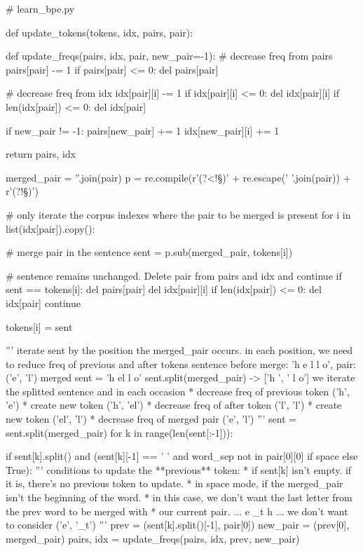 \begin{python}
# learn_bpe.py

def update_tokens(tokens, idx, pairs, pair):

  def update_freqs(pairs, idx, pair, new_pair=-1):
    # decrease freq from pairs
    pairs[pair] -= 1
    if pairs[pair] <= 0: del pairs[pair]

    # decrease freq from idx
    idx[pair][i] -= 1
    if idx[pair][i] <= 0: del idx[pair][i]
    if len(idx[pair]) <= 0: del idx[pair]

    if new_pair != -1:
        pairs[new_pair] += 1
        idx[new_pair][i] += 1

    return pairs, idx

  merged_pair = ''.join(pair)
  p = re.compile(r'(?<!\S)' + re.escape(' '.join(pair)) + r'(?!\S)')

  # only iterate the corpus indexes where the pair to be merged is present
  for i in list(idx[pair]).copy():

    # merge pair in the sentence
    sent = p.sub(merged_pair, tokens[i])

    # sentence remains unchanged. Delete pair from pairs and idx and continue
    if sent == tokens[i]:
        del pairs[pair]
        del idx[pair][i]
        if len(idx[pair]) <= 0:
            del idx[pair]
        continue

    tokens[i] = sent

    '''
    iterate sent by the position the merged_pair occurs. 
    in each position, we need to reduce freq of previous and after tokens
    sentence before merge: 'h e l l o', pair: ('e', 'l')
    merged sent = 'h el l o'
    sent.split(merged_pair) -> ['h ', ' l o']
    we iterate the splitted sentence and in each occasion
    * decrease freq of previous token ('h', 'e')
        * create new token ('h', 'el')
    * decrease freq of after token ('l', 'l')
        * create new token ('el', 'l')
    * decrease freq of merged pair ('e', 'l')
    '''
    sent = sent.split(merged_pair)
    for k in range(len(sent[:-1])):

      if sent[k].split() and (sent[k][-1] == ' ' and word_sep not in pair[0][0] if space else True):
        '''
        conditions to update the **previous** token:
        * if sent[k] isn't empty. if it is, there's no previous token to update.
        * in space mode, if the merged_pair isn't the beginning of the word.
            * in this case, we don't want the last letter from the prev word to be merged with
            * our current pair. ... e _t h ... we don't want to consider ('e', '_t')
        '''
        prev = (sent[k].split()[-1], pair[0])
        new_pair = (prev[0], merged_pair)
        pairs, idx = update_freqs(pairs, idx, prev, new_pair)


\end{python}
